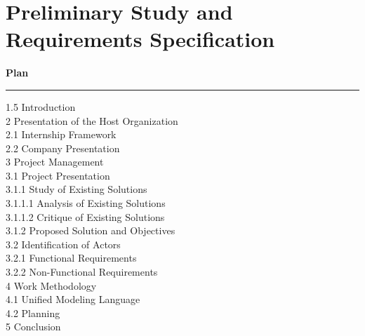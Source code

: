 \chapter{Preliminary Study and Requirements Specification}

\noindent\textbf{\LARGE Plan}
\begin{center}
    \rule[0.5ex]{1\columnwidth}{1pt}
\end{center}

\begin{spacing}{1.5}
\normalsize
{} Introduction \\
2 Presentation of the Host Organization \\
\hspace*{0.5cm}2.1 Internship Framework \\
\hspace*{0.5cm}2.2 Company Presentation \\
3 Project Management \\
\hspace*{0.5cm}3.1 Project Presentation \\
\hspace*{1cm}3.1.1 Study of Existing Solutions \\
\hspace*{1.5cm}3.1.1.1 Analysis of Existing Solutions \\
\hspace*{1.5cm}3.1.1.2 Critique of Existing Solutions \\
\hspace*{1cm}3.1.2 Proposed Solution and Objectives \\
\hspace*{0.5cm}3.2 Identification of Actors \\
\hspace*{1cm}3.2.1 Functional Requirements \\
\hspace*{1cm}3.2.2 Non-Functional Requirements \\
4 Work Methodology \\
\hspace*{0.5cm}4.1 Unified Modeling Language \\
\hspace*{0.5cm}4.2 Planning \\
5 Conclusion 
\end{spacing}


